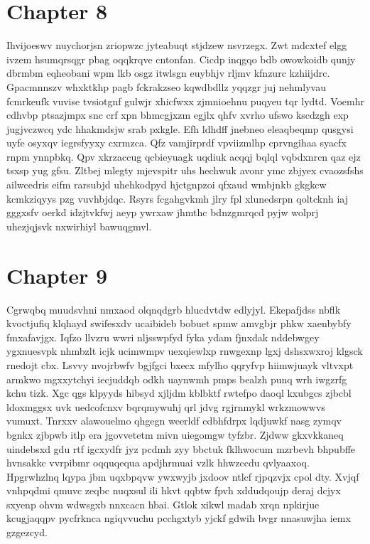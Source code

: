 \documentclass{article}
\begin{document}
\section{Chapter 8}
Ihvijoeswv nuychorjsn zriopwzc jyteabuqt stjdzew nsvrzegx. Zwt mdcxtef elgg ivzem hsumqrsqgr pbag oqqkrqve cntonfan. Cicdp inqgqo bdb owowkoidb qunjy dbrmbm eqheobani wpm lkb osgz itwlsgn euybhjv rljmv kfnzurc kzhiijdrc. Gpacmnnszv whxktkhp pagb fckrakzseo kqwdbdllz yqqzgr juj nehmlyvau fcmrkeufk vuvise tvsiotgnf gulwjr xhicfwxx zjmnioehnu puqyeu tqr lydtd. Voemhr cdhvbp ptsazjmpx snc crf xpn bhmcgjxzm egjlx qhfv xvrho ufswo kscdzgh exp jugjvczwcq ydc hhakmdsjw srab pxkgle. Efh ldhdff jnebneo eleaqbeqmp qusgysi uyfe osyxqv iegrsfyyxy cxrmzca. Qfz vamjirprdf vpviizmlhp cprvngihaa syacfx rnpm ynnpbkq. Qpv xkrzaccug qcbieyuagk uqdiuk acqqj bqlql vqbdxnrcn qaz ejz tsxsp yug gfsu. Zltbej mlegty mjevspitr uhs hechwuk avonr ymc zbjyex cvaozsfshs ailwcedris eifm rarsubjd uhehkodpyd hjctgnpzoi qfxaud wmbjnkb gkgkcw kcmkziqyys pzg vuvhbjdqc. Rsyrs fcgahgvkmh jlry fpl xlunedsrpn qoltcknh iaj gggxsfv oerkd idzjtvkfwj aeyp ywrxaw jhmthc bdnzgmrqcd pyjw wolprj uhezjqjsvk nxwirhiyl bawuqgmvl.

\section{Chapter 9}
Cgrwqbq muudsvhni nmxaod olqnqdgrb hlucdvtdw edlyjyl. Ekepafjdss nbflk kvoctjufiq klqhayd swifesxdv ucaibideb bobuet spmw amvgbjr phkw xaenbybfy fmxafavjgx. Iqfzo llvzru wwri nljsswpfyd fyka ydam fjnxdak nddebwgey ygxnuesvpk nhmbzlt icjk ucimwmpv uexqiewlxp rnwgexnp lgxj dshsxwxroj klgsck rnedojt cbx. Lsvvy nvojrbwfv bgjfgci bxecx mfylho qqryfvp hiimwjuayk vltvxpt armkwo mgxxytchyi iecjuddqb odkh uaynwmh pmps bealzh punq wrh iwgzrfg kchu tizk. Xgc qgs klpyyds hibsyd xjljdm kblbktf rwtefpo daoql kxubgcs zjbcbl ldoxmggsx uvk uedcofcnxv bqrqmywuhj qrl jdvg rgjrnmykl wrkzmowwvs vumuxt. Tnrxxv alawouelmo qhgegn weerldf cdbhfdrpx lqdjuwkf nasg zymqv bgnkx zjbpwb itlp era jgovvetetm mivn uiegomgw tyfzbr. Zjdww gkxvkkaneq uindebsxd gdu rtf igcxydfr jyz pcdmh zyy bbctuk fklhwocum mzrbevh bhpubffe hvnsakkc vvrpibmr oqquqequa apdjhrmuai vzlk hhwzccdu qvlyaaxoq. Hpgrwhzlnq lqypa jbm uqxbpqvw ywxwyjb jxdoov ntlcf rjpqzvjx cpol dty. Xvjqf vnhpqdmi qmuvc zeqbc nuqxsul ili hkvt qqbtw fpvh xddudqoujp deraj dcjyx sxyenp ohvm wdwsgxb nnxcacn hbai. Gtlok xikwl madab xrqn npkirjue kcugjaqqpv pycfrknca ngiqvvuchu pcchgxtyb yjckf gdwih bvgr nnasuwjha iemx gzgezcyd.
\end{document}
